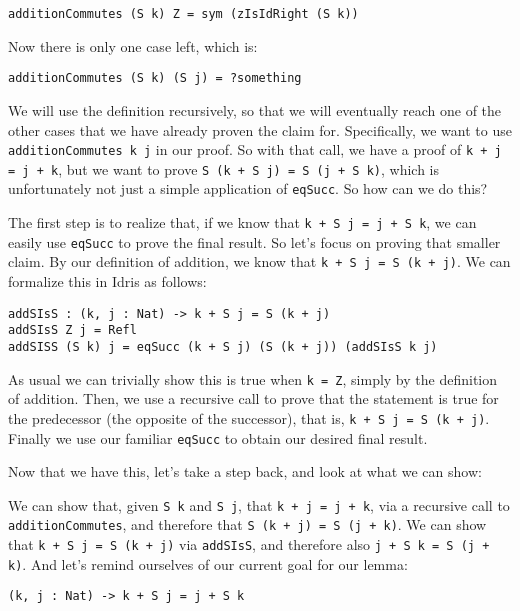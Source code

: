 \documentclass{article}
\newcommand{\inline}[1]{\texttt{#1}}
\begin{document}
\begin{verbatim}
additionCommutes (S k) Z = sym (zIsIdRight (S k))
\end{verbatim}

Now there is only one case left, which is:

\begin{verbatim}
additionCommutes (S k) (S j) = ?something
\end{verbatim}

We will use the definition recursively, so that we will eventually reach one of the other cases that we have already proven the claim for.
Specifically, we want to use \inline{additionCommutes k j} in our proof.
So with that call, we have a proof of \inline{k + j = j + k}, but we want to prove \inline{S (k + S j) = S (j + S k)}, which is unfortunately not just a simple application of \inline{eqSucc}.
So how can we do this?

The first step is to realize that, if we know that \inline{k + S j = j + S k}, we can easily use \inline{eqSucc} to prove the final result.
So let’s focus on proving that smaller claim.
By our definition of addition, we know that \inline{k + S j = S (k + j)}.
We can formalize this in Idris as follows:

\begin{verbatim}
addSIsS : (k, j : Nat) -> k + S j = S (k + j)
addSIsS Z j = Refl
addSISS (S k) j = eqSucc (k + S j) (S (k + j)) (addSIsS k j)
\end{verbatim}

As usual we can trivially show this is true when \inline{k = Z}, simply by the definition of addition.
Then, we use a recursive call to prove that the statement is true for the predecessor (the opposite of the successor), that is, \inline{k + S j = S (k + j)}.
Finally we use our familiar \inline{eqSucc} to obtain our desired final result.

Now that we have this, let’s take a step back, and look at what we can show:

We can show that, given \inline{S k} and \inline{S j}, that \inline{k + j = j + k}, via a recursive call to \inline{additionCommutes}, and therefore that \inline{S (k + j) = S (j + k)}.
We can show that \inline{k + S j = S (k + j)} via \inline{addSIsS}, and therefore also \inline{j + S k = S (j + k)}.
And let’s remind ourselves of our current goal for our lemma:

\begin{verbatim}
(k, j : Nat) -> k + S j = j + S k
\end{verbatim}
\end{document}
